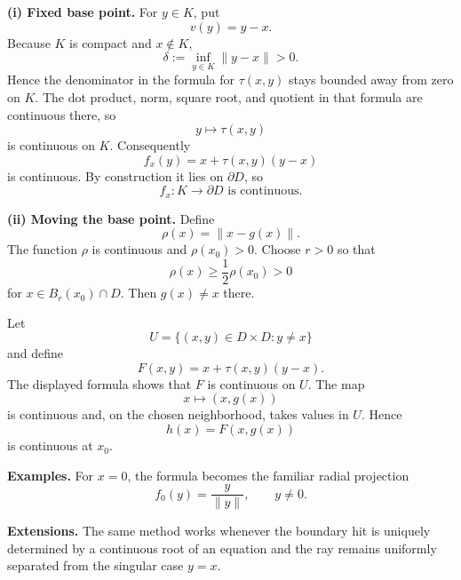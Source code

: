 \begin{solution}

\par\smallskip\noindent\textbf{(i) Fixed base point.}
For \(y\in K\), put
\[
v(y)=y-x.
\]
Because \(K\) is compact and \(x\notin K\),
\[
\delta:=\inf_{y\in K}\|y-x\|>0.
\]
Hence the denominator in the formula for \(\tau(x,y)\) stays bounded away
from zero on \(K\). The dot product, norm, square root, and quotient in that
formula are continuous there, so
\[
y\longmapsto\tau(x,y)
\]
is continuous on \(K\). Consequently
\[
f_x(y)=x+\tau(x,y)(y-x)
\]
is continuous. By construction it lies on \(\partial D\), so
\[
\boxed{f_x:K\to\partial D\text{ is continuous}.}
\]

\par\smallskip\noindent\textbf{(ii) Moving the base point.}
Define
\[
\rho(x)=\|x-g(x)\|.
\]
The function \(\rho\) is continuous and
\(\rho(x_0)>0\). Choose \(r>0\) so that
\[
\rho(x)\ge\frac12\rho(x_0)>0
\]
for \(x\in B_r(x_0)\cap D\). Then \(g(x)\ne x\) there.

Let
\[
U=\{(x,y)\in D\times D:y\ne x\}
\]
and define
\[
F(x,y)=x+\tau(x,y)(y-x).
\]
The displayed formula shows that \(F\) is continuous on \(U\). The map
\[
x\longmapsto(x,g(x))
\]
is continuous and, on the chosen neighborhood, takes values in \(U\). Hence
\[
h(x)=F(x,g(x))
\]
is continuous at \(x_0\).

\medskip
\noindent\textbf{Examples.}
For \(x=0\), the formula becomes the familiar radial projection
\[
f_0(y)=\frac{y}{\|y\|},
\qquad y\ne0.
\]

\medskip
\noindent\textbf{Extensions.}
The same method works whenever the boundary hit is uniquely determined by a
continuous root of an equation and the ray remains uniformly separated from
the singular case \(y=x\).
\end{solution}

